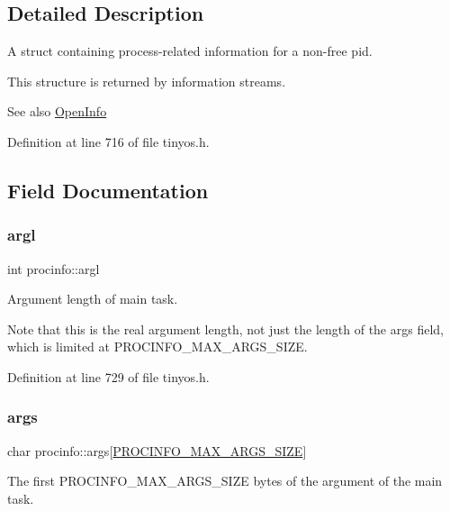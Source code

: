 \subsection{Detailed Description}
A struct containing process-\/related information for a non-\/free pid. 

This structure is returned by information streams. \begin{DoxySeeAlso}{See also}
\hyperlink{group__syscalls_gaf326b11574cdc84a9e21b9d860076821}{Open\+Info} 
\end{DoxySeeAlso}


Definition at line 716 of file tinyos.\+h.



\subsection{Field Documentation}
\mbox{\label{structprocinfo_ac63081c5a10bc230c115eea36c5f22fd}} 
\subsubsection{\texorpdfstring{argl}{argl}}
{\footnotesize\ttfamily int procinfo\+::argl}



Argument length of main task. 

Note that this is the real argument length, not just the length of the {\ttfamily args} field, which is limited at {\ttfamily P\+R\+O\+C\+I\+N\+F\+O\+\_\+\+M\+A\+X\+\_\+\+A\+R\+G\+S\+\_\+\+S\+I\+ZE}. 

Definition at line 729 of file tinyos.\+h.

\mbox{\label{structprocinfo_ac812ea3215fafc8ced9f91320b2d3959}} 
\subsubsection{\texorpdfstring{args}{args}}
{\footnotesize\ttfamily char procinfo\+::args\mbox{[}\hyperlink{group__syscalls_ga657ad9e9d81dcca25fb225cf99051e0d}{P\+R\+O\+C\+I\+N\+F\+O\+\_\+\+M\+A\+X\+\_\+\+A\+R\+G\+S\+\_\+\+S\+I\+ZE}\mbox{]}}



The first {\ttfamily P\+R\+O\+C\+I\+N\+F\+O\+\_\+\+M\+A\+X\+\_\+\+A\+R\+G\+S\+\_\+\+S\+I\+ZE} bytes of the argument of the main task. 

